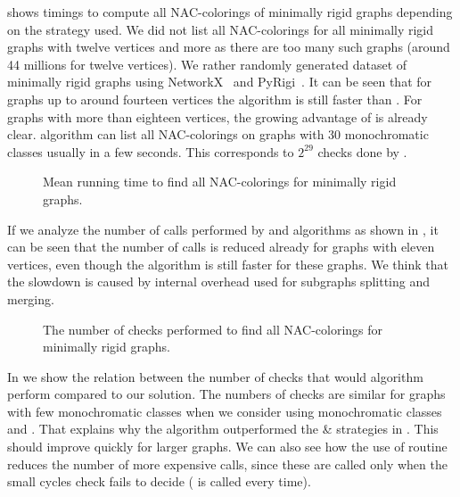 shows timings to compute all NAC-colorings of minimally rigid graphs
depending on the strategy used.
We did not list all NAC-colorings for all minimally rigid graphs with twelve vertices and more
as there are too many such graphs (around 44 millions for twelve vertices).
%
We rather randomly generated dataset of minimally rigid graphs
using NetworkX~\cite{networkx} and PyRigi~\cite{pyrigi}.
%
It can be seen that for graphs up to around fourteen vertices the \NaiveCycles{} algorithm
is still faster than \Subgraphs{}.
For graphs with more than eighteen vertices,
the growing advantage of \Subgraphs{} is already clear.
\Subgraphs{} algorithm can list all NAC-colorings on graphs with 30 monochromatic classes
usually in a few seconds.
This corresponds to \( 2^{29} \) checks done by \NaiveCycles{}.

\begin{figure}[ht]
	\centering
	\scalebox{\BenchFigureScale}{}
	\caption[Running time for minimally rigid graphs]{
		Mean running time to find all NAC-colorings for minimally rigid graphs.}%
	\label{fig:graph_time_minimally_rigid}
\end{figure}%

If we analyze the number of \IsNACColoring{} calls performed by \NaiveCycles{} and \Subgraphs{} algorithms
as shown in ,
it can be seen that the number of \IsNACColoring{} calls is reduced already for graphs
with eleven vertices,
even though the \NaiveCycles{} algorithm is still faster for these graphs.
%
We think that the slowdown is caused by internal overhead
used for subgraphs splitting and merging.

\begin{figure}[ht]
	\centering
	\scalebox{\BenchFigureScale}{}
	\caption[Checks performed for minimally rigid graphs]{
		The number of checks performed to find all NAC-colorings for minimally rigid graphs.}%
	\label{fig:graph_count_minimally_rigid}
\end{figure}%

In 
we show the relation between the number of \IsNACColoring{} checks that
would \Naive{} algorithm perform compared to our solution.
%
The numbers of checks are similar for graphs with few monochromatic classes
when we consider \NaiveCycles{} using monochromatic classes and \Subgraphs{}.
That explains why the \NaiveCycles{} algorithm outperformed
the \NeighborsDegree{} \& \MergeLinear{} strategies in . This should improve quickly for larger graphs.
We can also see how the use of \CycleMask{} routine
reduces the number of more expensive \IsNACColoring{} calls,
since these are called only when the small cycles check \CycleMask{} fails to decide
(\CycleMask{} is called every time).

